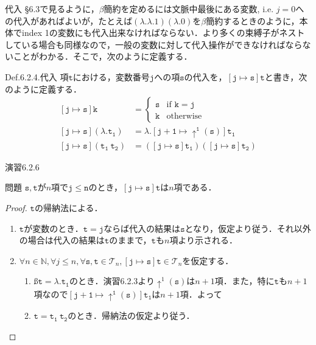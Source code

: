 \documentclass[9pt]{beamer}
\begin{document}
\begin{frame}{代入}
	\S 6.3で見るように，$\beta$簡約を定めるには文脈中最後にある変数, i.e. $j = 0$への代入があればよいが，たとえば$(\lambda. \lambda. 1)(\lambda. 0)$を$\beta$簡約するときのように，本体でindex 1の変数にも代入出来なければならない．より多くの束縛子がネストしている場合も同様なので，一般の変数に対して代入操作ができなければならないことがわかる．そこで，次のように定義する．
\begin{dblock}{Def.6.2.4.代入}
	項$\mathtt{t}$における，変数番号$\mathtt{j}$への項$\mathtt{s}$の代入を，$\mathtt{\left[j\mapsto s\right]t}$と書き，次のように定義する．
	\begin{align*}
		\mathtt{\left[j\mapsto s\right]k} &=\begin{cases}
			\mathtt{s}&\text{if $\mathtt{k = j}$}\\
			\mathtt{k}&\text{otherwise}
		\end{cases}\\
		\mathtt{\left[j\mapsto s\right]}(\mathtt{\lambda. t_{1}})&= \lambda. \mathtt{\left[j + 1\mapsto \uparrow^{1}(s)\right]t_{1}}\\
		\mathtt{\left[j\mapsto s\right]}(\mathtt{t_{1}\ t_{2}}) &= (\mathtt{\left[j\mapsto s\right]t_{1}})(\mathtt{\left[j\mapsto s\right]t_{2}})
	\end{align*}
\end{dblock}
\end{frame}
\begin{frame}{演習6.2.6}
\begin{alertblock}{問題}
$\mathtt{s, t}$が$n$項で$\mathtt{j \leq n}$のとき，$\mathtt{\left[j\mapsto s\right]t}$は$n$項である．\end{alertblock}
\begin{proof}
$\mathtt{t}$の帰納法による．\begin{enumerate}
\item $\mathtt{t}$が変数のとき．$\mathtt{t = j}$ならば代入の結果は$\mathtt{s}$となり，仮定より従う．それ以外の場合は代入の結果は$\mathtt{t}$のままで，$\mathtt{t}$も$n$項より示される．
\item $\forall n\in\mathbb{N}, \forall j \leq n, \forall \mathtt{s, t}\in\mathcal{T}_{n}, \mathtt{\left[j\mapsto s\right]t}\in\mathcal{T}_{n}$を仮定する．\begin{enumerate}\item ß$\mathtt{t = \lambda. t_{1}}$のとき．演習6.2.3より$\uparrow^{1}(\mathtt{s})$は$n + 1$項．また，特に$\mathtt{t}$も$n + 1$項なので$\mathtt{\left[j + 1\mapsto \uparrow^{1}(s)\right]t_{1}}$は$n + 1$項．よって
\item $\mathtt{t =t_{1}\ t_{2}}$のとき．帰納法の仮定より従う．
\end{enumerate}
\end{enumerate}
\end{proof}\end{frame}
\end{document}
